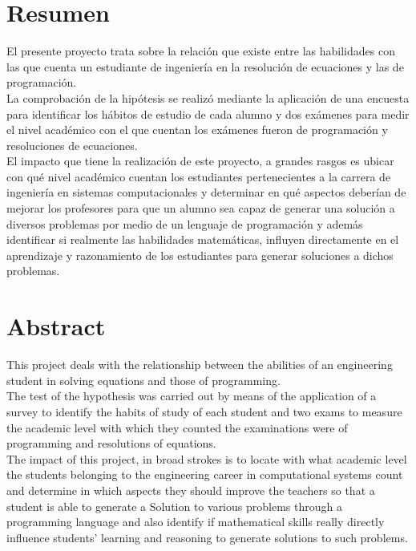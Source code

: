 \documentclass[12pt] {report}
\begin{document}

\section{Resumen}
El presente proyecto trata sobre la relación que existe entre las habilidades con las que cuenta un estudiante de ingeniería en la resolución de ecuaciones y las de programación.\\
La comprobación de la hipótesis se realizó mediante la aplicación de una encuesta para identificar los hábitos de estudio de cada alumno y dos exámenes para medir el nivel académico con el que cuentan los exámenes fueron de programación y resoluciones de ecuaciones.\\
El impacto que tiene la realización de este proyecto, a grandes rasgos es ubicar con qué nivel académico cuentan los estudiantes pertenecientes a la carrera de ingeniería en sistemas computacionales y determinar en qué aspectos deberían de mejorar los profesores para que un alumno sea capaz de generar una solución a diversos problemas por medio de un lenguaje de programación y además identificar si realmente las habilidades matemáticas, influyen directamente en el aprendizaje y razonamiento de los estudiantes para generar soluciones a dichos problemas.\\

\section{Abstract}

This project deals with the relationship between the abilities of an engineering student in solving equations and those of programming.\\
The test of the hypothesis was carried out by means of the application of a survey to identify the habits of study of each student and two exams to measure the academic level with which they counted the examinations were of programming and resolutions of equations.\\
The impact of this project, in broad strokes is to locate with what academic level the students belonging to the engineering career in computational systems count and determine in which aspects they should improve the teachers so that a student is able to generate a Solution to various problems through a programming language and also identify if mathematical skills really directly influence students' learning and reasoning to generate solutions to such problems.\\
\\
\end{document}

